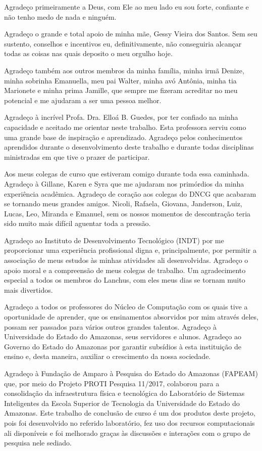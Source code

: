 Agradeço primeiramente a Deus, com Ele ao meu lado eu sou forte, confiante e não tenho medo de nada e ninguém.

Agradeço o grande e total apoio de minha mãe, Gessy Vieira dos Santos. Sem seu sustento, conselhos e incentivos eu, definitivamente, não conseguiria alcançar todas as coisas nas quais deposito o meu orgulho hoje. 

Agradeço também aos outros membros da minha família, minha irmã Denize, minha sobrinha Emanuella, meu pai Walter, minha avó Antônia, minha tia Marionete e minha prima Jamille, que sempre me fizeram acreditar no meu potencial e me ajudaram a ser uma pessoa melhor.

Agradeço à incrível Profa. Dra. Elloá B. Guedes, por ter confiado na minha capacidade e aceitado me orientar neste trabalho. Esta professora serviu como uma grande base de inspiração e aprendizado. Agradeço pelos conhecimentos aprendidos durante o desenvolvimento deste trabalho e  durante todas disciplinas ministradas em que tive o prazer de participar.

Aos meus colegas de curso que estiveram comigo durante toda essa caminhada. Agradeço à Gillane, Karen e Syra que me ajudaram nos primórdios da minha experiência acadêmica. Agradeço de coração aos colegas do DNCG que acabaram se tornando meus grandes amigos. Nicoli, Rafaela, Giovana, Janderson, Luiz, Lucas, Leo, Miranda e Emanuel, sem os nossos momentos de descontração teria sido muito mais difícil aguentar toda a pressão.

Agradeço ao Instituto de Desenvolvimento Tecnológico (INDT) por me proporcionar uma experiência profissional digna e, principalmente, por permitir a associação de meus estudos às minhas atividades ali desenvolvidas. Agradeço o apoio moral e a compreensão de meus colegas de trabalho. Um agradecimento especial a todos os membros do Lanchus, com eles meus dias se tornam muito mais divertidos.

Agradeço a todos os professores do Núcleo de Computação com os quais tive a oportunidade de aprender, que os ensinamentos absorvidos por mim através deles, possam ser passados para vários outros grandes talentos. Agradeço à Universidade do Estado do Amazonas, seus servidores e alunos. Agradeço ao Governo do Estado do Amazonas por garantir subsídios à esta instituição de ensino e, desta maneira, auxiliar o crescimento da nossa sociedade.

Agradeço à Fundação de Amparo à Pesquisa do Estado do Amazonas (FAPEAM) que, por meio do Projeto PROTI Pesquisa 11/2017, colaborou para a consolidação da infraestrutura física e tecnológica do Laboratório de Sistemas Inteligentes da Escola Superior de Tecnologia da Universidade do Estado do Amazonas. Este trabalho de conclusão de curso é um dos produtos deste projeto, pois foi desenvolvido no referido laboratório, fez uso dos recursos computacionais ali disponíveis e foi melhorado graças às discussões e interações com o grupo de pesquisa nele sediado.